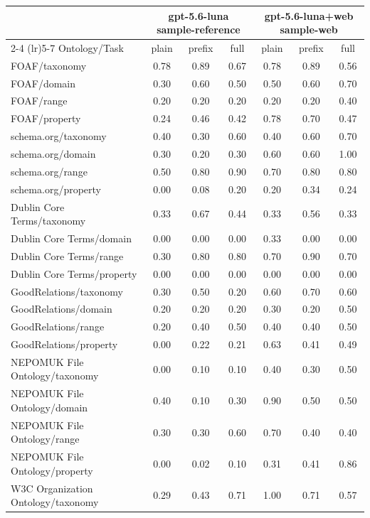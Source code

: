 \begin{tabular}{lcccccc}
\toprule
 & \multicolumn{3}{c}{gpt-5.6-luna sample-reference} & \multicolumn{3}{c}{gpt-5.6-luna+web sample-web} \\
\cmidrule(lr){2-4} \cmidrule(lr){5-7}
Ontology/Task & plain & prefix & full & plain & prefix & full \\
\midrule
FOAF/taxonomy & 0.78 & 0.89 & 0.67 & 0.78 & 0.89 & 0.56 \\
FOAF/domain & 0.30 & 0.60 & 0.50 & 0.50 & 0.60 & 0.70 \\
FOAF/range & 0.20 & 0.20 & 0.20 & 0.20 & 0.20 & 0.40 \\
FOAF/property & 0.24 & 0.46 & 0.42 & 0.78 & 0.70 & 0.47 \\
schema.org/taxonomy & 0.40 & 0.30 & 0.60 & 0.40 & 0.60 & 0.70 \\
schema.org/domain & 0.30 & 0.20 & 0.30 & 0.60 & 0.60 & 1.00 \\
schema.org/range & 0.50 & 0.80 & 0.90 & 0.70 & 0.80 & 0.80 \\
schema.org/property & 0.00 & 0.08 & 0.20 & 0.20 & 0.34 & 0.24 \\
Dublin Core Terms/taxonomy & 0.33 & 0.67 & 0.44 & 0.33 & 0.56 & 0.33 \\
Dublin Core Terms/domain & 0.00 & 0.00 & 0.00 & 0.33 & 0.00 & 0.00 \\
Dublin Core Terms/range & 0.30 & 0.80 & 0.80 & 0.70 & 0.90 & 0.70 \\
Dublin Core Terms/property & 0.00 & 0.00 & 0.00 & 0.00 & 0.00 & 0.00 \\
GoodRelations/taxonomy & 0.30 & 0.50 & 0.20 & 0.60 & 0.70 & 0.60 \\
GoodRelations/domain & 0.20 & 0.20 & 0.20 & 0.30 & 0.20 & 0.50 \\
GoodRelations/range & 0.20 & 0.40 & 0.50 & 0.40 & 0.40 & 0.50 \\
GoodRelations/property & 0.00 & 0.22 & 0.21 & 0.63 & 0.41 & 0.49 \\
NEPOMUK File Ontology/taxonomy & 0.00 & 0.10 & 0.10 & 0.40 & 0.30 & 0.50 \\
NEPOMUK File Ontology/domain & 0.40 & 0.10 & 0.30 & 0.90 & 0.50 & 0.50 \\
NEPOMUK File Ontology/range & 0.30 & 0.30 & 0.60 & 0.70 & 0.40 & 0.40 \\
NEPOMUK File Ontology/property & 0.00 & 0.02 & 0.10 & 0.31 & 0.41 & 0.86 \\
W3C Organization Ontology/taxonomy & 0.29 & 0.43 & 0.71 & 1.00 & 0.71 & 0.57 \\

\end{tabular}
